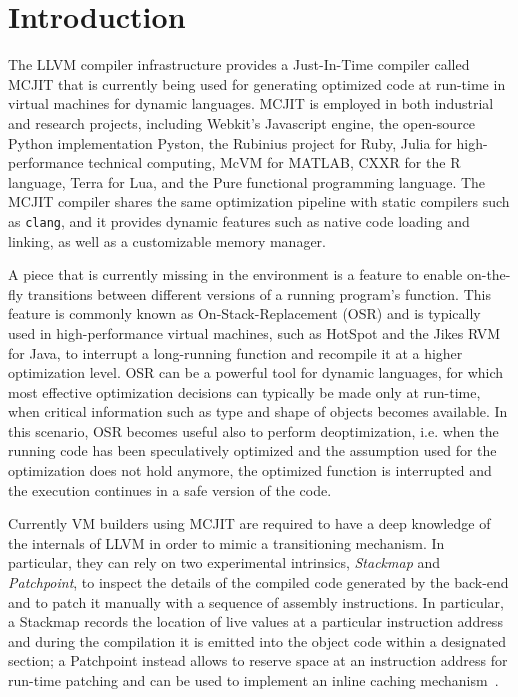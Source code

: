 \section{Introduction}
\label{se:intro}

The LLVM compiler infrastructure provides a Just-In-Time compiler called MCJIT that is currently being used for generating optimized code at run-time in virtual machines for dynamic languages. MCJIT is employed in both industrial and research projects, including Webkit's Javascript engine, the open-source Python implementation Pyston, the Rubinius project for Ruby, Julia for high-performance technical computing, McVM for MATLAB, CXXR for the R language, Terra for Lua, and the Pure functional programming language. The MCJIT compiler shares the same optimization pipeline with static compilers such as {\tt clang}, and it provides dynamic features such as native code loading and linking, as well as a customizable memory manager.

A piece that is currently missing in the environment is a feature to enable on-the-fly transitions between different versions of a running program's function. This feature is commonly known as On-Stack-Replacement (OSR) and is typically used in high-performance virtual machines, such as HotSpot and the Jikes RVM for Java, to interrupt a long-running function and recompile it at a higher optimization level. OSR can be a powerful tool for dynamic languages, for which most effective optimization decisions can typically be made only at run-time, when critical information such as type and shape of objects becomes available. In this scenario, OSR becomes useful also to perform deoptimization, i.e. when the running code has been speculatively optimized and the assumption used for the optimization does not hold anymore, the optimized function is interrupted and the execution continues in a safe version of the code.

Currently VM builders using MCJIT are required to have a deep knowledge of the internals of LLVM in order to mimic a transitioning mechanism. In particular, they can rely on two experimental intrinsics, {\em Stackmap} and {\em Patchpoint}, to inspect the details of the compiled code generated by the back-end and to patch it manually with a sequence of assembly instructions. In particular, a Stackmap records the location of live values at a particular instruction address and during the compilation it is emitted into the object code within a designated section; a Patchpoint instead allows to reserve space at an instruction address for run-time patching and can be used to implement an inline caching mechanism~\cite{deutsch1984inlinecaching}.
  
